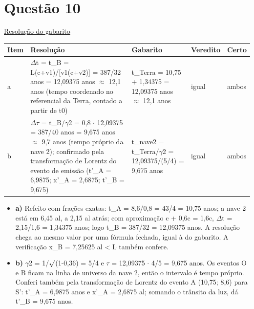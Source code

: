 \documentclass{article}%
\begin{document}
\section*{Questão 10}%
\href{https://poliedroresolve.sistemapoliedro.com.br/vestibulares/ita/2026/ita-2-fase-dia-3-30-10-2025-2-fase-dia-3/dissertativa-10-fisica-2-fase-dia-3-ita-2026}{Resolução do gabarito}\par\smallskip%
\begin{longtable}{@{}p{} p{} p{} p{} p{}@{}}\toprule Item & Resolução & Gabarito & Veredito & Certo \\ \midrule
a & $\Delta$t = t\_B = L(c+v1)/{[}v1(c+v2){]} = 387/32 anos = 12,09375 anos $\approx$ 12,1 anos (tempo coordenado no referencial da Terra, contado a partir de t0) & t\_Terra = 10,75 + 1,34375 = 12,09375 anos $\approx$ 12,1 anos & igual & ambos \\
b & $\Delta$$\tau$ = t\_B/$\gamma$2 = 0,8 $\cdot$ 12,09375 = 387/40 anos = 9,675 anos $\approx$ 9,7 anos (tempo próprio da nave 2); confirmado pela transformação de Lorentz do evento de emissão (t'\_A = 6,9875; x'\_A = 2,6875; t'\_B = 9,675) & t\_nave2 = t\_Terra/$\gamma$2 = 12,09375/(5/4) = 9,675 anos & igual & ambos \\
\bottomrule\end{longtable}%
\begin{itemize}%
\item%
\textbf{a)} Refeito com frações exatas: t\_A = 8,6/0,8 = 43/4 = 10,75 anos; a nave 2 está em 6,45 al, a 2,15 al atrás; com aproximação c + 0,6c = 1,6c, $\Delta$t = 2,15/1,6 = 1,34375 anos; logo t\_B = 387/32 = 12,09375 anos. A resolução chega ao mesmo valor por uma fórmula fechada, igual à do gabarito. A verificação x\_B = 7,25625 al < L também confere.%
\item%
\textbf{b)} $\gamma$2 = 1/$\surd$(1-0,36) = 5/4 e $\tau$ = 12,09375 $\cdot$ 4/5 = 9,675 anos. Os eventos O e B ficam na linha de universo da nave 2, então o intervalo é tempo próprio. Conferi também pela transformação de Lorentz do evento A (10,75; 8,6) para S': t'\_A = 6,9875 anos e x'\_A = 2,6875 al; somando o trânsito da luz, dá t'\_B = 9,675 anos.%
\end{itemize}%
\end{document}
